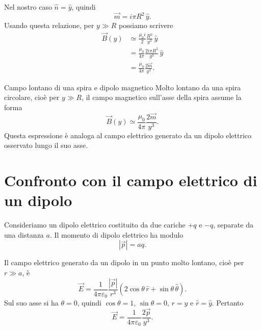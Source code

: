 \documentclass[a4paper]{article}
\begin{document}
Nel nostro caso \(\hat{n}=\hat{y}\), quindi
\[
    \vec{m}=i\pi R^2\,\hat{y}.
\]
Usando questa relazione, per \(y\gg R\) possiamo scrivere
\begin{align*}
    \vec{B}(y)
    &\simeq \frac{\mu_0 i}{2}\frac{R^2}{y^3}\,\hat{y} \\
    &= \frac{\mu_0}{4\pi}\frac{2i\pi R^2}{y^3}\,\hat{y} \\
    &= \frac{\mu_0}{4\pi}\frac{2\vec{m}}{y^3}.
\end{align*}

\begin{snippetproposition}{Campo lontano di una spira e dipolo magnetico}
    Molto lontano da una spira circolare, cioè per \(y\gg R\), il campo magnetico sull'asse della spira assume la forma
    \[
        \vec{B}(y)\simeq \frac{\mu_0}{4\pi}\frac{2\vec{m}}{y^3}.
    \]
    Questa espressione è analoga al campo elettrico generato da un dipolo elettrico osservato lungo il suo asse.
\end{snippetproposition}

\section{Confronto con il campo elettrico di un dipolo}

Consideriamo un dipolo elettrico costituito da due cariche \(+q\) e \(-q\), separate da una distanza \(a\). Il momento di dipolo elettrico ha modulo
\[
    |\vec{p}|=aq.
\]

\begin{center}
\end{center}

Il campo elettrico generato da un dipolo in un punto molto lontano, cioè per \(r\gg a\), è
\[
    \vec{E}=\frac{1}{4\pi\varepsilon_0}\frac{|\vec{p}|}{r^3}\left(2\cos\theta\,\hat{r}+\sin\theta\,\hat{\theta}\right).
\]
Sul suo asse si ha \(\theta=0\), quindi \(\cos\theta=1\), \(\sin\theta=0\), \(r=y\) e \(\hat{r}=\hat{y}\). Pertanto
\[
    \vec{E}=\frac{1}{4\pi\varepsilon_0}\frac{2\vec{p}}{y^3}.
\]
\end{document}
